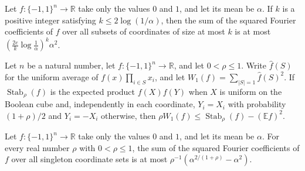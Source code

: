 \begin{theorem}
\label{FABL.levelKInequality}
\leanok
{}
Let $f:\{-1,1\}^n\to\mathbb R$ take only the values $0$ and $1$, and let its mean be
$\alpha$. If $k$ is a positive integer satisfying $k\le 2\log(1/\alpha)$, then the sum
of the squared Fourier coefficients of $f$ over all subsets of coordinates of size at
most $k$ is at most $\left(\frac{2e}{k}\log\frac{1}{\alpha}\right)^k\alpha^2$.
\end{theorem}

\begin{theorem}
\label{FABL.rho_mul_fourierWeightAtLevel_one_le_stability_sub_mean_sq}
\leanok
{}
Let $n$ be a natural number, let $f:\{−1,1\}^n\to\mathbb R$, and let $0<\rho\le 1$.
Write $\widehat f(S)$ for the uniform average of $f(x)\prod_{i\in S}x_i$, and let
$W_1(f)=\sum_{|S|=1}\widehat f(S)^2$. If $\operatorname{Stab}_\rho(f)$ is the expected
product $f(X)f(Y)$ when $X$ is uniform on the Boolean cube and, independently in each
coordinate, $Y_i=X_i$ with probability $(1+\rho)/2$ and $Y_i=-X_i$ otherwise, then $\rho
W_1(f)\le \operatorname{Stab}_\rho(f)-(\mathbb E f)^2$.
\end{theorem}

\begin{theorem}
\label{FABL.levelOneInequality_parameterized}
\leanok
{}
Let $f:\{-1,1\}^n\to\mathbb R$ take only the values $0$ and $1$, and let its mean be
$\alpha$. For every real number $\rho$ with $0<\rho\le 1$, the sum of the squared
Fourier coefficients of $f$ over all singleton coordinate sets is at most
$\rho^{-1}\left(\alpha^{2/(1+\rho)}-\alpha^2\right)$.
\end{theorem}

